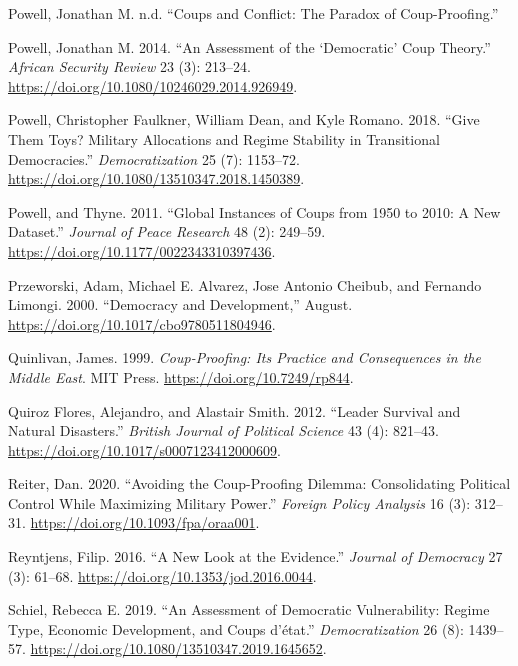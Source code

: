 \documentclass[
  12pt,
]{report}
\newlength{\cslhangindent}
\newenvironment{CSLReferences}[2] %
 {\begin{list}{}{%
  \setlength{\itemindent}{0pt}
  \setlength{\leftmargin}{0pt}
  \setlength{\parsep}{0pt}
  \ifodd #1
   \setlength{\leftmargin}{\cslhangindent}
   \setlength{\itemindent}{-1\cslhangindent}
  \fi
  \setlength{\itemsep}{#2\baselineskip}}}
 {\end{list}}
\begin{document}
\begin{CSLReferences}{1}{0}
Powell, Jonathan M. n.d. {``Coups and Conflict: The Paradox of
Coup-Proofing.''}

Powell, Jonathan M. 2014. {``An Assessment of the {`}Democratic{'} Coup
Theory.''} \emph{African Security Review} 23 (3): 213--24.
\url{https://doi.org/10.1080/10246029.2014.926949}.

Powell, Christopher Faulkner, William Dean, and Kyle Romano. 2018.
{``Give Them Toys? Military Allocations and Regime Stability in
Transitional Democracies.''} \emph{Democratization} 25 (7): 1153--72.
\url{https://doi.org/10.1080/13510347.2018.1450389}.

Powell, and Thyne. 2011. {``Global Instances of Coups from 1950 to 2010:
A New Dataset.''} \emph{Journal of Peace Research} 48 (2): 249--59.
\url{https://doi.org/10.1177/0022343310397436}.

Przeworski, Adam, Michael E. Alvarez, Jose Antonio Cheibub, and Fernando
Limongi. 2000. {``Democracy and Development,''} August.
\url{https://doi.org/10.1017/cbo9780511804946}.

Quinlivan, James. 1999. \emph{Coup-Proofing: Its Practice and
Consequences in the Middle East}. MIT Press.
\url{https://doi.org/10.7249/rp844}.

Quiroz Flores, Alejandro, and Alastair Smith. 2012. {``Leader Survival
and Natural Disasters.''} \emph{British Journal of Political Science} 43
(4): 821--43. \url{https://doi.org/10.1017/s0007123412000609}.

Reiter, Dan. 2020. {``Avoiding the Coup-Proofing Dilemma: Consolidating
Political Control While Maximizing Military Power.''} \emph{Foreign
Policy Analysis} 16 (3): 312--31.
\url{https://doi.org/10.1093/fpa/oraa001}.

Reyntjens, Filip. 2016. {``A New Look at the Evidence.''} \emph{Journal
of Democracy} 27 (3): 61--68.
\url{https://doi.org/10.1353/jod.2016.0044}.

Schiel, Rebecca E. 2019. {``An Assessment of Democratic Vulnerability:
Regime Type, Economic Development, and Coups d{'}état.''}
\emph{Democratization} 26 (8): 1439--57.
\url{https://doi.org/10.1080/13510347.2019.1645652}.


\end{CSLReferences}
\end{document}
